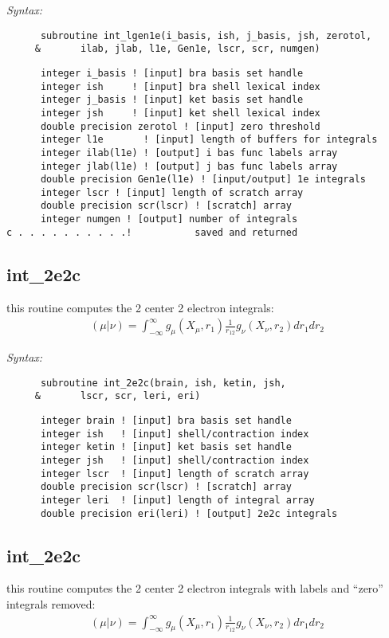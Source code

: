 {\it Syntax:} 
\begin{verbatim} 
      subroutine int_lgen1e(i_basis, ish, j_basis, jsh, zerotol, 
     &       ilab, jlab, l1e, Gen1e, lscr, scr, numgen)  
\end{verbatim} 
\begin{verbatim} 
      integer i_basis ! [input] bra basis set handle 
      integer ish     ! [input] bra shell lexical index 
      integer j_basis ! [input] ket basis set handle 
      integer jsh     ! [input] ket shell lexical index 
      double precision zerotol ! [input] zero threshold 
      integer l1e       ! [input] length of buffers for integrals 
      integer ilab(l1e) ! [output] i bas func labels array 
      integer jlab(l1e) ! [output] j bas func labels array 
      double precision Gen1e(l1e) ! [input/output] 1e integrals 
      integer lscr ! [input] length of scratch array 
      double precision scr(lscr) ! [scratch] array 
      integer numgen ! [output] number of integrals  
c . . . . . . . . . .!           saved and returned 
\end{verbatim} 
\subsection{int\_2e2c} 
this routine computes the 2 center 2 electron integrals:  
\begin{eqnarray*} 
({\mu}|{\nu}) = \int_{-\infty}^{\infty} g_{\mu}(X_{\mu},r_{1})\frac{1}{r_{12}}g_{\nu}(X_{\nu},r_{2})dr_{1}dr_{2} 
\end{eqnarray*} 
 
{\it Syntax:} 
\begin{verbatim} 
      subroutine int_2e2c(brain, ish, ketin, jsh,  
     &       lscr, scr, leri, eri) 
\end{verbatim} 
\begin{verbatim} 
      integer brain ! [input] bra basis set handle 
      integer ish   ! [input] shell/contraction index 
      integer ketin ! [input] ket basis set handle 
      integer jsh   ! [input] shell/contraction index 
      integer lscr  ! [input] length of scratch array 
      double precision scr(lscr) ! [scratch] array 
      integer leri  ! [input] length of integral array 
      double precision eri(leri) ! [output] 2e2c integrals 
\end{verbatim} 
\subsection{int\_2e2c} 
this routine computes the 2 center 2 electron integrals 
with labels and ``zero'' integrals removed:  
\begin{eqnarray*} 
({\mu}|{\nu}) = \int_{-\infty}^{\infty} g_{\mu}(X_{\mu},r_{1})\frac{1}{r_{12}}g_{\nu}(X_{\nu},r_{2})dr_{1}dr_{2} 
\end{eqnarray*} 
 
